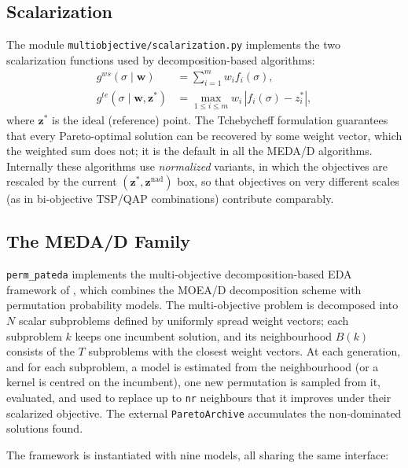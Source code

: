\documentclass[a4paper,11pt]{article}
\begin{document}
\subsection{Scalarization}

The module \texttt{multiobjective/scalarization.py} implements the two
scalarization functions used by decomposition-based algorithms:
\begin{align}
g^{ws}(\sigma \mid \mathbf{w}) &= \sum_{i=1}^{m} w_i f_i(\sigma), \\
g^{te}(\sigma \mid \mathbf{w}, \mathbf{z}^\ast) &=
  \max_{1 \leq i \leq m} w_i\, |f_i(\sigma) - z_i^\ast| ,
\end{align}
where $\mathbf{z}^\ast$ is the ideal (reference) point.  The Tchebycheff
formulation guarantees that every Pareto-optimal solution can be recovered by
some weight vector, which the weighted sum does not; it is the default in all the
MEDA/D algorithms.  Internally these algorithms use \emph{normalized} variants,
in which the objectives are rescaled by the current $(\mathbf{z}^\ast,
\mathbf{z}^{\text{nad}})$ box, so that objectives on very different scales
(as in bi-objective TSP/QAP combinations) contribute comparably.

\subsection{The MEDA/D Family}

\texttt{perm\_pateda} implements the multi-objective decomposition-based EDA
framework of \cite{Zangari_et_al:2017}, which combines the MOEA/D decomposition
scheme \citep{Zhang_and_Li:2007} with permutation probability models.  The
multi-objective problem is decomposed into $N$ scalar subproblems defined by
uniformly spread weight vectors; each subproblem $k$ keeps one incumbent
solution, and its neighbourhood $B(k)$ consists of the $T$ subproblems with the
closest weight vectors.  At each generation, and for each subproblem, a model is
estimated from the neighbourhood (or a kernel is centred on the incumbent), one
new permutation is sampled from it, evaluated, and used to replace up to
\texttt{nr} neighbours that it improves under their scalarized objective.  The
external \texttt{ParetoArchive} accumulates the non-dominated solutions found.

The framework is instantiated with nine models, all sharing the same interface:
\end{document}
